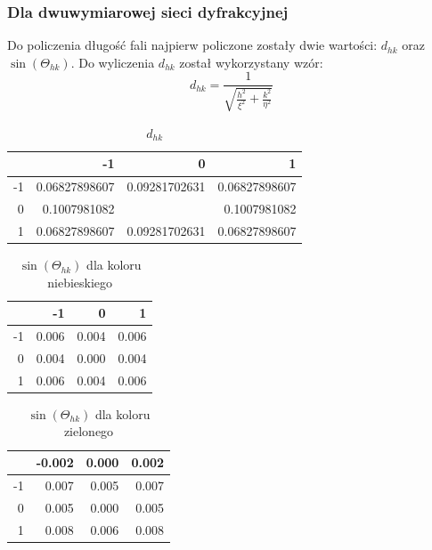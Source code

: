 \documentclass{article}
\begin{document}
\subsubsection{Dla dwuwymiarowej sieci dyfrakcyjnej}
Do policzenia długość fali najpierw policzone zostały dwie wartości: $d_{hk}$ oraz $\sin(\Theta_{hk})$. Do wyliczenia $d_{hk}$ został wykorzystany wzór:
$$ d_{hk} = \frac{1}{\sqrt{\frac{h^2}{\xi^2}+\frac{k^2}{\eta^2}}} $$
\begin{table}[H]
\centering
\begin{tabular}{r|r|r|r}
\multicolumn{1}{l}{} & -1            & 0             & 1             \\ \hline
-1                   & 0.06827898607 & 0.09281702631 & 0.06827898607 \\
0                    & 0.1007981082  &               & 0.1007981082  \\
1                    & 0.06827898607 & 0.09281702631 & 0.06827898607
\end{tabular}
\caption{$d_{hk}$}
\end{table}

\begin{table}[H]
\centering
\begin{tabular}{r|r|r|r}
\multicolumn{1}{l}{} & -1     & 0     & 1     \\ \hline
-1                   & 0.006  & 0.004 & 0.006 \\
0                    & 0.004  & 0.000 & 0.004 \\
1                    & 0.006  & 0.004 & 0.006 \\
\end{tabular}
\caption{$\sin(\Theta_{hk})$ dla koloru niebieskiego}
\end{table}

\begin{table}[H]
\centering
\begin{tabular}{r|r|r|r}
\multicolumn{1}{l}{} & -0.002 & 0.000 & 0.002 \\ \hline
-1                   & 0.007  & 0.005 & 0.007 \\
0                    & 0.005  & 0.000 & 0.005 \\
1                    & 0.008  & 0.006 & 0.008 \\
\end{tabular}
\caption{$\sin(\Theta_{hk})$ dla koloru zielonego}
\end{table}
\end{document}
